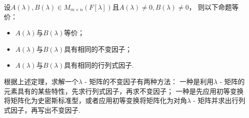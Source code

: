 \begin{theorem}\label{theorem:lambda矩阵.两个lambda矩阵等价的等价条件1}
设\(A(\lambda), B(\lambda) \in M_{m \times n}(F[\lambda])\)且\(A(\lambda) \neq 0, B(\lambda) \neq 0\)，
则以下命题等价：\begin{itemize}
	\item \(A(\lambda)\)与\(B(\lambda)\)等价；
	\item \(A(\lambda)\)与\(B(\lambda)\)具有相同的不变因子；
	\item \(A(\lambda)\)与\(B(\lambda)\)具有相同的行列式因子.
\end{itemize}
\end{theorem}
\begin{remark}
根据上述定理，求解一个\(\lambda\) - 矩阵的不变因子有两种方法：
一种是利用\(\lambda\) - 矩阵的元素具有的某些特性，先求行列式因子，再求不变因子；
一种是先应用初等变换将矩阵化为史密斯标准型，或者应用初等变换将矩阵化为对角\(\lambda\) - 矩阵并求出行列式因子，再写出不变因子.
\end{remark}

